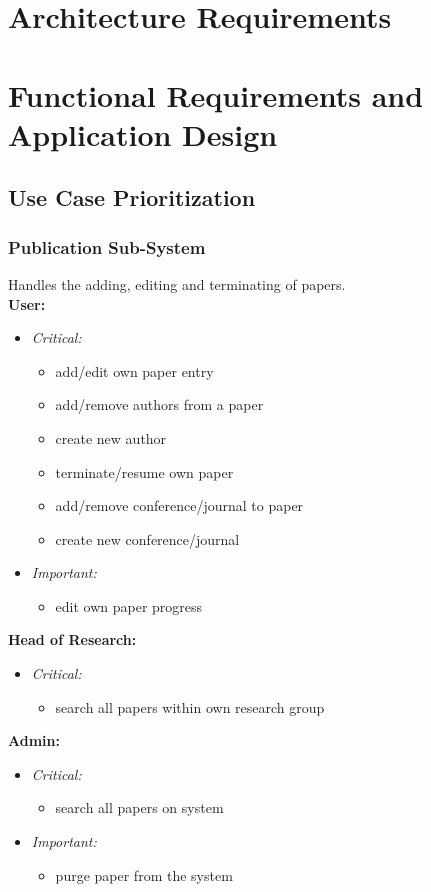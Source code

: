 \documentclass{article}
\begin{document}
	\cleardoublepage
	\section{Architecture Requirements}\label{sec:architecture}
		
	\cleardoublepage
	\section{Functional Requirements and Application Design}\label{sec:functional}
		\subsection{Use Case Prioritization}
			\subsubsection{Publication Sub-System}\label{subsubsec:priority-paper}
				Handles the adding, editing and terminating of papers.\\
				[3mm]
				\textbf{User:}
				\begin{itemize}
					\item \textit{Critical:}
					\begin{itemize}
						\item add/edit own paper entry
						\item add/remove authors from a paper
						\item create new author
						\item terminate/resume own paper
						\item add/remove conference/journal to paper
						\item create new conference/journal
					\end{itemize}
					
					\item \textit{Important:}
					\begin{itemize}
						\item edit own paper progress
					\end{itemize}
				\end{itemize}
				\textbf{Head of Research:}
				\begin{itemize}
					\item \textit{Critical:}
					\begin{itemize}
						\item search all papers within own research group
					\end{itemize}
				\end{itemize}
				\textbf{Admin:}
				\begin{itemize}
					\item \textit{Critical:}
					\begin{itemize}
						\item search all papers on system
					\end{itemize}
					
					\item \textit{Important:}
					\begin{itemize}
						\item purge paper from the system
					\end{itemize}
				\end{itemize}
\end{document}
